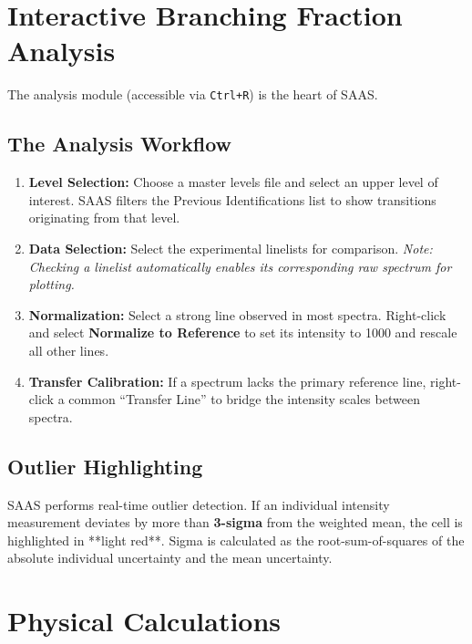 \documentclass[11pt,a4paper]{article}
\begin{document}
\section{Interactive Branching Fraction Analysis}
The analysis module (accessible via \texttt{Ctrl+R}) is the heart of SAAS.

\subsection{The Analysis Workflow}
\begin{enumerate}
    \item \textbf{Level Selection:} Choose a master levels file and select an upper level of interest. SAAS filters the Previous Identifications list to show transitions originating from that level.
    \item \textbf{Data Selection:} Select the experimental linelists for comparison. \textit{Note: Checking a linelist automatically enables its corresponding raw spectrum for plotting.}
    \item \textbf{Normalization:} Select a strong line observed in most spectra. Right-click and select \textbf{Normalize to Reference} to set its intensity to 1000 and rescale all other lines.
    \item \textbf{Transfer Calibration:} If a spectrum lacks the primary reference line, right-click a common ``Transfer Line'' to bridge the intensity scales between spectra.
\end{enumerate}

\subsection{Outlier Highlighting}
SAAS performs real-time outlier detection. If an individual intensity measurement deviates by more than \textbf{3-sigma} from the weighted mean, the cell is highlighted in **light red**. Sigma is calculated as the root-sum-of-squares of the absolute individual uncertainty and the mean uncertainty.

\section{Physical Calculations}
\end{document}
